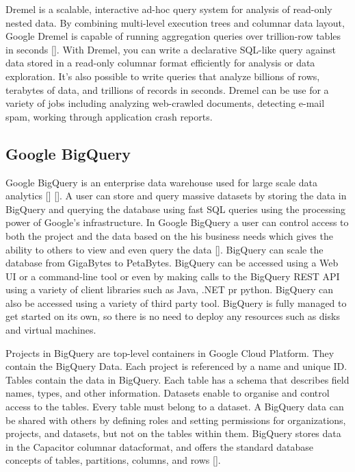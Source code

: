 Dremel is a scalable, interactive ad-hoc query system for analysis of
read-only nested data. By combining multi-level execution trees and
columnar data layout, Google Dremel is capable of running aggregation
queries over trillion-row tables in seconds [\cite{paper-dremel}]. With
Dremel, you can write a declarative SQL-like query against data stored
in a read-only columnar format efficiently for analysis or data
exploration.  It's also possible to write queries that analyze
billions of rows, terabytes of data, and trillions of records in
seconds. Dremel can be use for a variety of jobs including analyzing
web-crawled documents, detecting e-mail spam, working through
application crash reports.

\subsection{Google BigQuery}


Google BigQuery is an enterprise data warehouse used for large scale
data analytics [\cite{www-bigquery-documentation}] [\cite{www-bigquery}].
A user can store and query massive datasets by storing the data in
BigQuery and querying the database using fast SQL queries using the
processing power of Google's infrastructure. In Google BigQuery a user
can control access to both the project and the data based on the his
business needs which gives the ability to others to view and even
query the data [\cite{www-bigquery}]. BigQuery can scale the database
from GigaBytes to PetaBytes. BigQuery can be accessed using a Web UI
or a command-line tool or even by making calls to the BigQuery REST
API using a variety of client libraries such as Java, .NET pr
python. BigQuery can also be accessed using a variety of third party
tool. BigQuery is fully managed to get started on its own, so there is
no need to deploy any resources such as disks and virtual machines.

Projects in BigQuery are top-level containers in Google Cloud
Platform\cite{www-bigquery-documentation}. They contain the BigQuery
Data. Each project is referenced by a name and unique ID. Tables
contain the data in BigQuery. Each table has a schema that describes
field names, types, and other information. Datasets enable to organise
and control access to the tables. Every table must belong to a
dataset. A BigQuery data can be shared with others by defining roles
and setting permissions for organizations, projects, and datasets, but
not on the tables within them. BigQuery stores data in the Capacitor
columnar datacformat, and offers the standard database concepts of
tables, partitions, columns, and
rows [\cite{www-bigquery-columnar-storage}].

